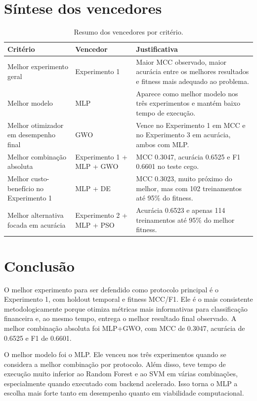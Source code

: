 \documentclass[12pt,a4paper]{article}
\begin{document}
\section{Síntese dos vencedores}

\begin{table}[H]
\centering
\caption{Resumo dos vencedores por critério.}
\label{tab:winners}
\begin{tabular}{p{4.2cm}p{4.2cm}p{6.2cm}}
\toprule
Critério & Vencedor & Justificativa \\
\midrule
Melhor experimento geral & Experimento 1 & Maior MCC observado, maior acurácia entre os melhores resultados e fitness mais adequado ao problema. \\
Melhor modelo & MLP & Aparece como melhor modelo nos três experimentos e mantém baixo tempo de execução. \\
Melhor otimizador em desempenho final & GWO & Vence no Experimento 1 em MCC e no Experimento 3 em acurácia, ambos com MLP. \\
Melhor combinação absoluta & Experimento 1 + MLP + GWO & MCC 0.3047, acurácia 0.6525 e F1 0.6601 no teste cego. \\
Melhor custo-benefício no Experimento 1 & MLP + DE & MCC 0.3023, muito próximo do melhor, mas com 102 treinamentos até 95\% do fitness. \\
Melhor alternativa focada em acurácia & Experimento 2 + MLP + PSO & Acurácia 0.6523 e apenas 114 treinamentos até 95\% do melhor fitness. \\
\bottomrule
\end{tabular}
\end{table}

\section{Conclusão}

O melhor experimento para ser defendido como protocolo principal é o Experimento 1, com holdout temporal e fitness MCC/F1. Ele é o mais consistente metodologicamente porque otimiza métricas mais informativas para classificação financeira e, ao mesmo tempo, entrega o melhor resultado final observado. A melhor combinação absoluta foi MLP+GWO, com MCC de 0.3047, acurácia de 0.6525 e F1 de 0.6601.

O melhor modelo foi o MLP. Ele venceu nos três experimentos quando se considera a melhor combinação por protocolo. Além disso, teve tempo de execução muito inferior ao Random Forest e ao SVM em várias combinações, especialmente quando executado com backend acelerado. Isso torna o MLP a escolha mais forte tanto em desempenho quanto em viabilidade computacional.
\end{document}
